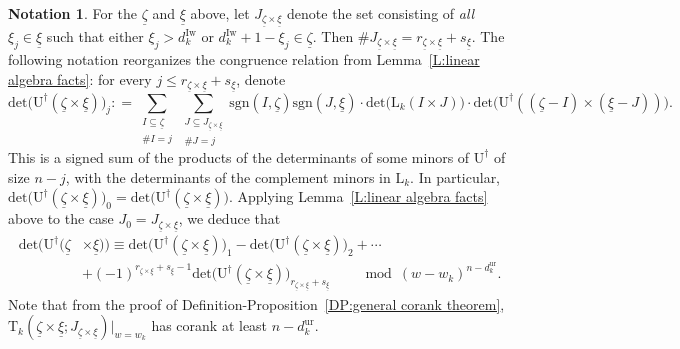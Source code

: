 \documentclass[12pt]{amsart}
\theoremstyle{definition}
\newtheorem{notation}[subsection]{Notation}
\numberwithin{equation}{subsection}
\def\rmL{\mathrm{L}}
\def\rmU{\mathrm{U}}
\def\rmT{\mathrm{T}}
\newcommand{\Iw}{\mathrm{Iw}}
\renewcommand{\det}{\mathrm{det}}
\newcommand{\sgn}{\mathrm{sgn}}
\newcommand{\ur}{\mathrm{ur}}
\begin{document}
\begin{notation}
For the $\underline \zeta$ and $\underline \xi$ above, let $J_{\underline \zeta \times \underline \xi}$ denote the set consisting of \emph{all} $\xi_j \in \underline \xi$ such that either $\xi_j > d_k^\Iw$ or $d_k^\Iw+1-\xi_j \in \underline \zeta$. Then $\# J_{\underline \zeta \times \underline \xi} = r_{\underline \zeta \times \underline \xi} + s_{\underline \xi}$.
The following notation reorganizes the congruence relation from Lemma~\ref{L:linear algebra facts}: for every $j \leq r_{\underline \zeta \times \underline \xi} + s_{\underline \xi}$, denote
\begin{equation}
\label{E:definition of det Uj}
\det\big( \rmU^\dagger(\underline \zeta \times \underline \xi)\big)_j: = \sum_{\substack{I \subseteq \underline \zeta\\ \#I = j}} \sum_{\substack{J \subseteq J_{\underline \zeta \times \underline \xi}\\ \#J = j}} \sgn(I, \underline \zeta) \sgn(J, \underline \xi) \cdot \det\big(\rmL_k(I \times J)\big) \cdot \det \big( \rmU^\dagger((\underline \zeta-I) \times (\underline \xi-J))\big).
\end{equation}
This is a signed sum of the products of the determinants of some minors of $\rmU^\dagger$ of size $n-j$, with the determinants of the complement minors in $\rmL_k$.
In particular, $\det\big( \rmU^\dagger(\underline \zeta \times \underline \xi)\big)_0 = \det\big( \rmU^\dagger(\underline \zeta \times \underline \xi)\big)$. Applying Lemma~\ref{L:linear algebra facts} above to the case $J_0 = J_{\underline \zeta \times \underline \xi}$, we deduce that
\begin{align}
\label{E:det as smaller minors}
\det\big( \rmU^\dagger(\underline \zeta &\times \underline \xi)\big) \equiv  \det\big( \rmU^\dagger(\underline \zeta \times \underline \xi)\big)_1 - \det\big( \rmU^\dagger(\underline \zeta \times \underline \xi)\big)_2 + \cdots 
\\
\nonumber
& + (-1)^{r_{\underline \zeta \times \underline \xi}+s_{\underline \xi}-1} \det\big( \rmU^\dagger(\underline \zeta \times \underline \xi)\big)_{r_{\underline \zeta \times \underline \xi}+s_{\underline \xi}} \qquad \bmod (w-w_k)^{n-d_k^\ur}.
\end{align}
Note that from the proof of Definition-Proposition~\ref{DP:general corank theorem},  $\rmT_k(\underline \zeta\times \underline\xi; 
J_{\underline \zeta \times \underline \xi})\big|_{w=w_k}$ has corank at least $n-d_k^\ur$.
\end{notation}
\end{document}
